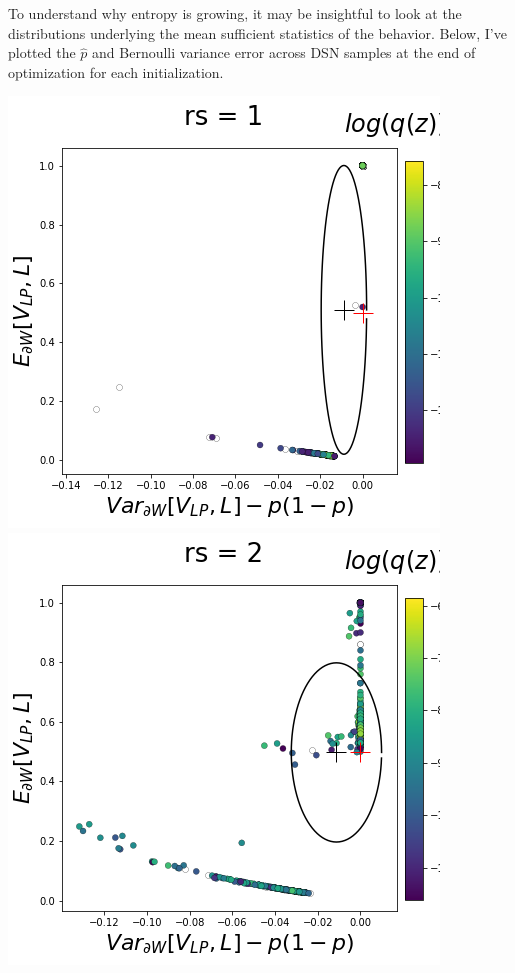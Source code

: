 \documentclass[11pt]{article}
\begin{document}
To understand why entropy is growing, it may be insightful to look at the distributions underlying the mean sufficient statistics of the behavior.  Below, I've plotted the $\hat{p}$ and Bernoulli variance error across DSN samples at the end of optimization for each initialization.
\begin{center}
\includegraphics[scale=0.33]{figs/T_x_SC_reduced_c=0_p=50_rs=1.png}
\includegraphics[scale=0.33]{figs/T_x_SC_reduced_c=0_p=50_rs=2.png}

\end{center}
\end{document}
